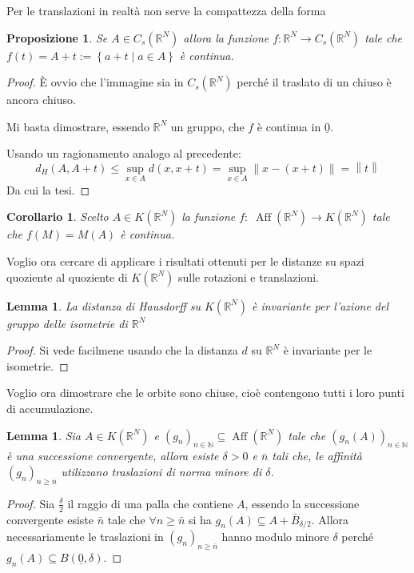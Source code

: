\documentclass[a4paper,10pt]{article}
\newcounter{counter1}
\theoremstyle{plain}
\newtheorem{mylem}[counter1]{Lemma}
\newtheorem{mypro}[counter1]{Proposizione}
\newtheorem{mycor}[counter1]{Corollario}
\theoremstyle{definition}
\theoremstyle{remark}
\newcommand{\ubar}[1]{\underline{#1}}
\newcommand{\set}[1]{\left\{#1\right\}}
\newcommand{\pa}[1]{\left(#1\right)}
\newcommand{\norm}[1]{\left\|#1\right\|}
\DeclareMathOperator{\aff}{Aff}
\begin{document}
Per le translazioni in realtà non serve la compattezza della forma
\begin{mypro}
  Se $A \in C_s(\mathbb{R}^N)$ allora la funzione $f: \mathbb{R}^N \to
  C_s(\mathbb{R}^N)$ tale che $f(t) = A + t := \set { a + t \mid a \in
    A}$ è continua.
\end{mypro}
\begin{proof}
  È ovvio che l'immagine sia in $C_s(\mathbb{R}^N)$ perché il traslato
  di un chiuso è ancora chiuso.
  
  Mi basta dimostrare, essendo $\mathbb{R}^N$ un gruppo, che $f$ è
  continua in $\ubar{0}$.
  
  Usando un ragionamento analogo al precedente:
  \[ d_H(A, A+t) \le \sup _{x \in A} d(x, x+t) = \sup _{x \in A}
  \norm{x-(x+t)} = \norm{t} \]
  Da cui la tesi.
\end{proof}

\begin{mycor}
  Scelto $A \in K(\mathbb{R}^N)$ la funzione $f:\; \aff( \mathbb{R}^N)
  \to K(\mathbb{R}^N)$ tale che $f(M) = M(A)$ è continua.
\end{mycor}

Voglio ora cercare di applicare i risultati ottenuti per le distanze
su spazi quoziente al quoziente di $K(\mathbb{R}^N)$ sulle rotazioni e
translazioni.

\begin{mylem}
  La distanza di Hausdorff su $K(\mathbb{R}^N)$ è invariante per
  l'azione del gruppo delle isometrie di $\mathbb{R}^N$
\end{mylem}
\begin{proof}
  Si vede facilmene usando che la distanza $d$ su $\mathbb{R}^N$ è
  invariante per le isometrie.
\end{proof}

Voglio ora dimostrare che le orbite sono chiuse, cioè contengono tutti
i loro punti di accumulazione.

\begin{mylem}
  \label{lem:traslazionipiccole}
  Sia $A \in K(\mathbb{R}^N)$ e $\pa{ g_n} _{n \in \mathbb{N}}
  \subseteq \aff( \mathbb{R}^N)$ tale che $\pa{ g_n(A) } _{n \in
    \mathbb{N}}$ è una successione convergente, allora esiste $\delta
  >0$ e $\bar n$ tali che, le affinità $\pa{ g_n} _{n\ge \bar n}$
  utilizzano traslazioni di norma minore di $\delta$.
\end{mylem}
\begin{proof}
  Sia $\frac{\delta}{2}$ il raggio di una palla che contiene $A$,
  essendo la successione convergente esiste $\bar n$ tale che $\forall
  n \ge \bar n$ si ha $g_n(A) \subseteq A + \bar B _{\delta
    /2}$. Allora necessariamente le traslazioni in $\pa{g_n}_{n \ge
    \bar n}$ hanno modulo minore $\delta$ perché $g_n(A) \subseteq
  B(\ubar{0}, \delta)$.
\end{proof}
\end{document}
